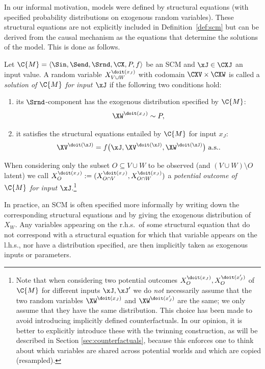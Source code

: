 In our informal motivation, models were defined by structural equations (with specified
probability distributions on exogenous random variables). These structural equations are not 
explicitly included in Definition~\ref{def:scm} but can be derived from the causal mechanism
as the equations that determine the solutions of the model. This is done as follows.

\begin{Def}\label{def:scm_solutions_for_inputs}
  Let $\C{M} = \langle \Sin, \Send, \Srnd, \CX, P, f \rangle$ be an SCM
  and $\xJ \in \CXJ$ an input value.
  A random variable $X_{V \cup W}^{\doit(x_J)}$ with codomain $\CXV \times \CXW$ is called
  a \emph{solution of $\C{M}$ for input $\xJ$} 
  if the following two conditions hold:
    \begin{enumerate}
      \item its $\Srnd$-component has the exogenous distribution specified by $\C{M}$: 
        $$\XW^{\doit(x_J)} \sim P,$$
      \item it satisfies the structural equations entailed by $\C{M}$ for input $x_J$:
        \begin{equation}\label{eq:cscm_structural_equations}
          \XV^{\doit(\xJ)} = f\big(\xJ, \XV^{\doit(\xJ)}, \XW^{\doit(\xJ)}\big) \text{ a.s.}.
        \end{equation}
    \end{enumerate}
  When considering only the subset $O \subseteq V \cup W$ to be observed (and $(V \cup W) \setminus O$ latent)
  we call $X_O^{\doit(x_J)} := (X_{O \cap V}^{\doit(x_J)},X_{O\cap W}^{\doit(x_J)})$ a
  \emph{potential outcome of $\C{M}$ for input $\xJ$}.\footnote{Note that when considering two
  potential outcomes $X_O^{\doit(x_J)},X_O^{\doit(x_J')}$ of $\C{M}$ for different inputs $\xJ, \xJ'$
  we do \emph{not} necessarily assume that the two random variables
  $\XW^{\doit(x_J)}$ and $\XW^{\doit(x_J')}$ are the same; we only assume that they have the
  same distribution. This choice has been made to avoid introducing implicitly defined counterfactuals.
  In our opinion, it is better to explicitly introduce these with the twinning construction, as will be
  described in Section \ref{sec:counterfactuals}, because this enforces one to think about which 
  variables are shared across potential worlds and which are copied (resampled).}
\end{Def}
In practice, an SCM is often specified more informally by writing down the corresponding structural
equations  and by giving the exogenous distribution of $X_W$. 
Any variables appearing
on the r.h.s.\ of some structural equation that do not correspond with a structural equation for which
that variable appears on the l.h.s., nor have a distribution specified, are then implicitly taken as
exogenous inputs or parameters.

